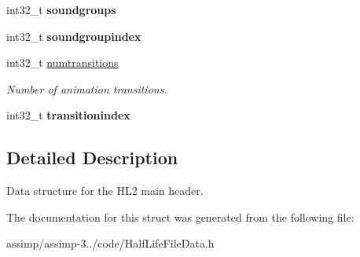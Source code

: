 \begin{DoxyCompactItemize}
\item 
\hypertarget{struct_assimp_1_1_m_d_l_1_1_header___h_l2_abd54be7ff147bca3c70624800b6968fc}{int32\+\_\+t {\bfseries soundgroups}}\label{struct_assimp_1_1_m_d_l_1_1_header___h_l2_abd54be7ff147bca3c70624800b6968fc}

\item 
\hypertarget{struct_assimp_1_1_m_d_l_1_1_header___h_l2_a2cf490fccec6c617cae6c3d1b02ec3e9}{int32\+\_\+t {\bfseries soundgroupindex}}\label{struct_assimp_1_1_m_d_l_1_1_header___h_l2_a2cf490fccec6c617cae6c3d1b02ec3e9}

\item 
\hypertarget{struct_assimp_1_1_m_d_l_1_1_header___h_l2_ac6e5534067adb3f8572979b832d7bb66}{int32\+\_\+t \hyperlink{struct_assimp_1_1_m_d_l_1_1_header___h_l2_ac6e5534067adb3f8572979b832d7bb66}{numtransitions}}\label{struct_assimp_1_1_m_d_l_1_1_header___h_l2_ac6e5534067adb3f8572979b832d7bb66}

\begin{DoxyCompactList}\small\item\em Number of animation transitions. \end{DoxyCompactList}\item 
\hypertarget{struct_assimp_1_1_m_d_l_1_1_header___h_l2_ab81077f5975a2c3f3b9eafafca90d293}{int32\+\_\+t {\bfseries transitionindex}}\label{struct_assimp_1_1_m_d_l_1_1_header___h_l2_ab81077f5975a2c3f3b9eafafca90d293}

\end{DoxyCompactItemize}


\subsection{Detailed Description}
Data structure for the H\+L2 main header. 

The documentation for this struct was generated from the following file\+:\begin{DoxyCompactItemize}
\item 
assimp/assimp-\/3../code/Half\+Life\+File\+Data.\+h\end{DoxyCompactItemize}

